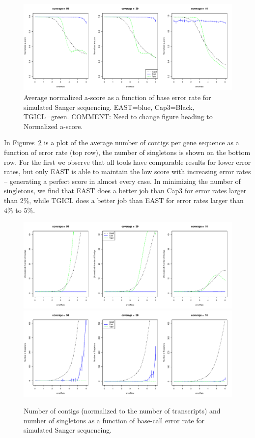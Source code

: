 \documentclass{bioinfo}
\newcommand{\capthree} {{\small Cap3}}
\newcommand{\tgicl} {{\small TGICL}}
\newcommand{\east} {{\small EAST}}
\begin{document}
\begin{figure}[htb]
\centerline{\includegraphics[width=6in]{pics.d/ascore_sanger_norm.pdf}}
\caption{Average normalized a-score as a function of base error rate for
  simulated Sanger sequencing.  \east=blue, \capthree=Black,
  \tgicl=green. COMMENT: Need to change figure heading to Normalized a-score.}
\label{sangerAscore}
\end{figure}

In Figures~\ref{contigsSanger} is a plot of the average number of
contigs per gene sequence as a function of error rate (top row), the
number of singletons is shown on the bottom row.  For the first we
observe that all tools have comparable results for lower error rates,
but only \east\/ is able to maintain the low score with increasing
error rates -- generating a perfect score in almost every case.  In
minimizing the number of singletons, we find that \east\/ does a
better job than \capthree\/ for error rates larger than $2\%$, while
\tgicl\/ does a better job than \east\/ for error rates larger than
$4\%$ to $5\%$.

\begin{figure}[htb]
\includegraphics[width=6in]{pics.d/numContigs_sanger.pdf}
\includegraphics[width=6in]{pics.d/numSingle_sanger.pdf}
\caption{Number of contigs (normalized to the number of transcripts)
  and number of singletons as a function of base-call error
  rate for simulated Sanger sequencing.}
\label{contigsSanger}
\end{figure}
\end{document}
